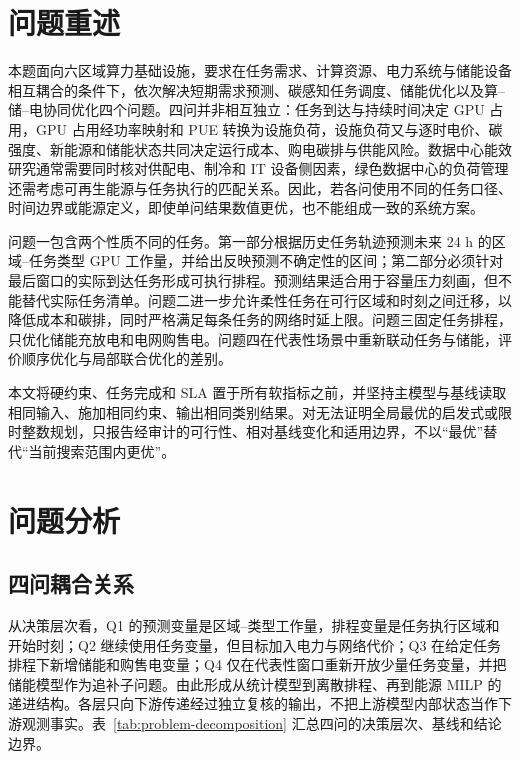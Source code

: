 \section{问题重述}

本题面向六区域算力基础设施，要求在任务需求、计算资源、电力系统与储能设备相互耦合的条件下，依次解决短期需求预测、碳感知任务调度、储能优化以及算--储--电协同优化四个问题。四问并非相互独立：任务到达与持续时间决定 GPU 占用，GPU 占用经功率映射和 PUE 转换为设施负荷，设施负荷又与逐时电价、碳强度、新能源和储能状态共同决定运行成本、购电碳排与供能风险。数据中心能效研究通常需要同时核对供配电、制冷和 IT 设备侧因素，绿色数据中心的负荷管理还需考虑可再生能源与任务执行的匹配关系。因此，若各问使用不同的任务口径、时间边界或能源定义，即使单问结果数值更优，也不能组成一致的系统方案。

问题一包含两个性质不同的任务。第一部分根据历史任务轨迹预测未来 24 h 的区域--任务类型 GPU 工作量，并给出反映预测不确定性的区间；第二部分必须针对最后窗口的实际到达任务形成可执行排程。预测结果适合用于容量压力刻画，但不能替代实际任务清单。问题二进一步允许柔性任务在可行区域和时刻之间迁移，以降低成本和碳排，同时严格满足每条任务的网络时延上限。问题三固定任务排程，只优化储能充放电和电网购售电。问题四在代表性场景中重新联动任务与储能，评价顺序优化与局部联合优化的差别。

本文将硬约束、任务完成和 SLA 置于所有软指标之前，并坚持主模型与基线读取相同输入、施加相同约束、输出相同类别结果。对无法证明全局最优的启发式或限时整数规划，只报告经审计的可行性、相对基线变化和适用边界，不以“最优”替代“当前搜索范围内更优”。

\section{问题分析}

\subsection{四问耦合关系}

从决策层次看，Q1 的预测变量是区域--类型工作量，排程变量是任务执行区域和开始时刻；Q2 继续使用任务变量，但目标加入电力与网络代价；Q3 在给定任务排程下新增储能和购售电变量；Q4 仅在代表性窗口重新开放少量任务变量，并把储能模型作为追补子问题。由此形成从统计模型到离散排程、再到能源 MILP 的递进结构。各层只向下游传递经过独立复核的输出，不把上游模型内部状态当作下游观测事实。表~\ref{tab:problem-decomposition} 汇总四问的决策层次、基线和结论边界。

